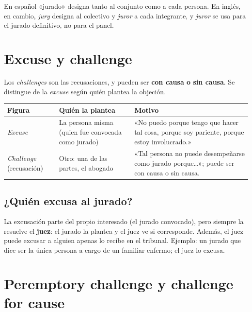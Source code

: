 \documentclass[12pt,oneside]{book}
\begin{document}
\begin{important}
En español «jurado» designa tanto al conjunto como a cada persona. En inglés, en cambio, \textit{jury} designa al colectivo y \textit{juror} a cada integrante, y \textit{juror} se usa para el jurado definitivo, no para el panel.
\end{important}

\section{Excuse y challenge}

Los \textit{challenges} son las recusaciones, y pueden ser \textbf{con causa o sin causa}. Se distingue de la \textit{excuse} según quién plantea la objeción.

\begin{table}[H]
\centering
\begin{tabularx}{\textwidth}{P{3.4cm}P{4.2cm}L}
\toprule
\textbf{Figura} & \textbf{Quién la plantea} & \textbf{Motivo} \\
\midrule
\textit{Excuse} & La persona misma (quien fue convocada como jurado) & «No puedo porque tengo que hacer tal cosa, porque soy pariente, porque estoy involucrado.» \\
\textit{Challenge} (recusación) & Otro: una de las partes, el abogado & «Tal persona no puede desempeñarse como jurado porque\ldots»; puede ser con causa o sin causa. \\
\bottomrule
\end{tabularx}
\end{table}

\subsection{¿Quién excusa al jurado?}

La excusación parte del propio interesado (el jurado convocado), pero siempre la resuelve el \textbf{juez}: el jurado la plantea y el juez ve si corresponde. Además, el juez puede excusar a alguien apenas lo recibe en el tribunal. Ejemplo: un jurado que dice ser la única persona a cargo de un familiar enfermo; el juez lo excusa.


\section{Peremptory challenge y challenge for cause}
\end{document}
